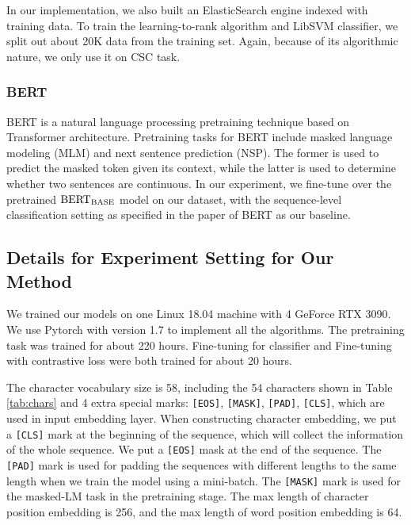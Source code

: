 \documentclass{article}
\begin{document}
In our implementation, we also built an ElasticSearch engine indexed with training data. To train the learning-to-rank algorithm and LibSVM classifier, we split out about 20K data from the training set. Again, because of its algorithmic nature, we only use it on CSC task.



\subsubsection{BERT}
BERT \cite{DBLP:conf/naacl/DevlinCLT19} is a natural language processing pretraining technique based on Transformer architecture. Pretraining tasks for BERT include masked language modeling (MLM) and next sentence prediction (NSP). The former is used to predict the masked token given its context, while the latter is used to determine whether two sentences are continuous.
In our experiment, we fine-tune over the pretrained $\rm{BERT_{BASE}}$ model on our dataset, with the sequence-level classification setting as specified in the paper of BERT as our baseline.



\subsection{Details for Experiment Setting for Our Method}

We trained our models on one Linux 18.04 machine with 4 GeForce RTX 3090. We use Pytorch with version 1.7 to implement all the algorithms. The pretraining task was trained for about 220 hours. Fine-tuning for classifier and Fine-tuning with contrastive loss were both trained for about 20 hours.

The character vocabulary size is 58, including the 54 characters shown in Table \ref{tab:chars} and 4 extra special marks: \texttt{[EOS]}, \texttt{[MASK]}, \texttt{[PAD]}, \texttt{[CLS]}, which are used in input embedding layer. When constructing character embedding, we put a \texttt{[CLS]} mark at the beginning of the sequence, which will collect the information of the whole sequence. We put a \texttt{[EOS]} mask at the end of the sequence. The \texttt{[PAD]} mark is used for padding the sequences with different lengths to the same length when we train the model using a mini-batch. The \texttt{[MASK]} mark is used for the masked-LM task in the pretraining stage. The max length of character position embedding is 256, and the max length of word position embedding is 64.
\end{document}
